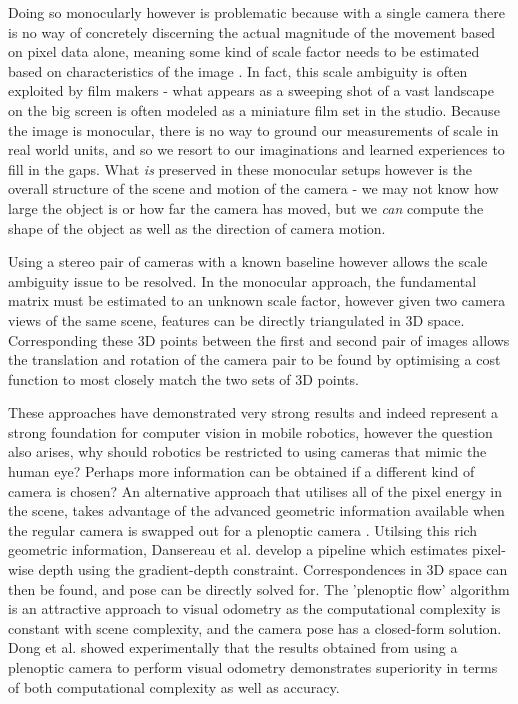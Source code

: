 \documentclass[openany]{book}
\begin{document}
Doing so monocularly however is problematic because with a single camera there is no way of concretely discerning the actual magnitude of the movement based on pixel data alone, meaning some kind of scale factor needs to be estimated based on characteristics of the image \cite{gakne2018scale, nister2004vo, zhou2016scale, zhou2019scale}. In fact, this scale ambiguity is often exploited by film makers - what appears as a sweeping shot of a vast landscape on the big screen is often modeled as a miniature film set in the studio. Because the image is monocular, there is no way to ground our measurements of scale in real world units, and so we resort to our imaginations and learned experiences to fill in the gaps. What \textit{is} preserved in these monocular setups however is the overall structure of the scene and motion of the camera - we may not know how large the object is or how far the camera has moved, but we \textit{can} compute the  shape of the object as well as the direction of camera motion. 

Using a stereo pair of cameras with a known baseline however allows the scale ambiguity issue to be resolved. In the monocular approach, the fundamental matrix must be estimated to an unknown scale factor, however given two camera views of the same scene, features can be directly triangulated in 3D space. Corresponding these 3D points between the first and second pair of images allows the translation and rotation of the camera pair to be found by optimising a cost function to most closely match the two sets of 3D points. 

These approaches have demonstrated very strong results and indeed represent a strong foundation for computer vision in mobile robotics, however the question also arises, why should robotics be restricted to using cameras that mimic the human eye? Perhaps more information can be obtained if a different kind of camera is chosen? An alternative approach that utilises all of the pixel energy in the scene, takes advantage of the advanced geometric information available when the regular camera is swapped out for a plenoptic camera \cite{dansereau2011plenopticflow}. Utilsing this rich geometric information, Dansereau et al. \cite{dansereau2011plenopticflow} develop a pipeline which estimates pixel-wise depth using the gradient-depth constraint. Correspondences in 3D space can then be found, and pose can be directly solved for. The 'plenoptic flow' algorithm is an attractive approach to visual odometry as the computational complexity is constant with scene complexity, and the camera pose has a closed-form solution. Dong et al. \cite{dong2013plenopticflow} showed experimentally that the results obtained from using a plenoptic camera to perform visual odometry demonstrates superiority in terms of both computational complexity as well as accuracy.
\end{document}
